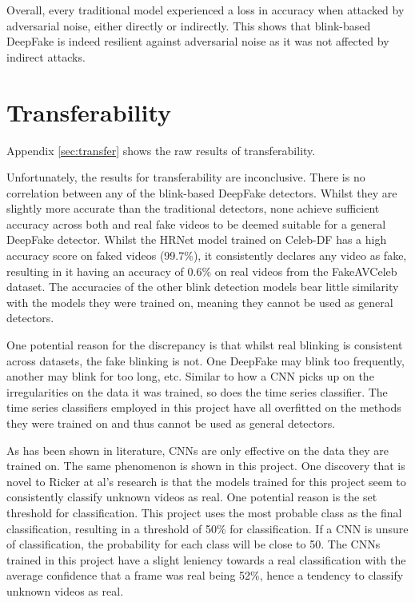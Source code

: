 Overall, every traditional model experienced a loss in accuracy when attacked by adversarial noise, either directly or indirectly. This shows that blink-based DeepFake is indeed resilient against adversarial noise as it was not affected by indirect attacks. 

\section{Transferability}

Appendix \ref{sec:transfer} shows the raw results of transferability.

Unfortunately, the results for transferability are inconclusive. There is no correlation between any of the blink-based DeepFake detectors. Whilst they are slightly more accurate than the traditional detectors, none achieve sufficient accuracy across both and real fake videos to be deemed suitable for a general DeepFake detector. Whilst the HRNet model trained on Celeb-DF has a high accuracy score on faked videos (99.7\%), it consistently declares any video as fake, resulting in it having an accuracy of 0.6\% on real videos from the FakeAVCeleb dataset. The accuracies of the other blink detection models bear little similarity with the models they were trained on, meaning they cannot be used as general detectors.

One potential reason for the discrepancy is that whilst real blinking is consistent across datasets, the fake blinking is not. One DeepFake may blink too frequently, another may blink for too long, etc. Similar to how a CNN picks up on the irregularities on the data it was trained, so does the time series classifier. The time series classifiers employed in this project have all overfitted on the methods they were trained on and thus cannot be used as general detectors.

As has been shown in literature\cite{ricker2022towards}, CNNs are only effective on the data they are trained on. The same phenomenon is shown in this project. One discovery that is novel to Ricker at al's research is that the models trained for this project seem to consistently classify unknown videos as real. One potential reason is the set threshold for classification. This project uses the most probable class as the final classification, resulting in a threshold of 50\% for classification. If a CNN is unsure of classification, the probability for each class will be close to 50. The CNNs trained in this project have a slight leniency towards a real classification with the average confidence that a frame was real being 52\%, hence a tendency to classify unknown videos as real.

